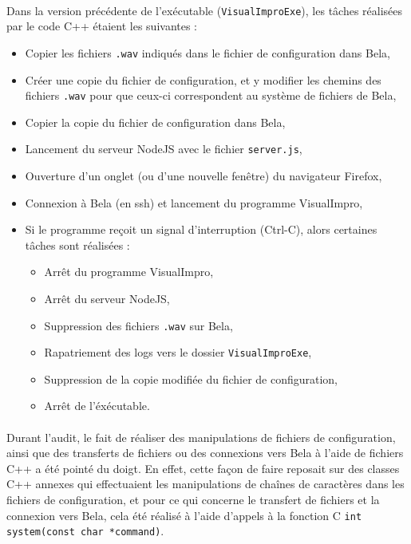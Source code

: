 \paragraph{}
Dans la version précédente de l'exécutable (\verb!VisualImproExe!),
les tâches réalisées par le code C++ étaient les suivantes :
\begin{itemize}
 \item Copier les fichiers \verb!.wav! indiqués dans le fichier de
       configuration dans Bela,
 \item Créer une copie du fichier de configuration, et y modifier les
       chemins des fichiers \verb!.wav! pour que ceux-ci correspondent au
       système de fichiers de Bela,
 \item Copier la copie du fichier de configuration dans Bela,
 \item Lancement du serveur NodeJS avec le fichier \verb!server.js!,
 \item Ouverture d'un onglet (ou d'une nouvelle fenêtre) du
       navigateur Firefox,
 \item Connexion à Bela (en ssh) et lancement du programme
       VisualImpro,
 \item Si le programme reçoit un signal d'interruption (Ctrl-C),
       alors certaines tâches sont réalisées :
       \begin{itemize}
        \item Arrêt du programme VisualImpro,
        \item Arrêt du serveur NodeJS,
        \item Suppression des fichiers \verb!.wav! sur Bela,
        \item Rapatriement des logs vers le dossier \verb!VisualImproExe!,
        \item Suppression de la copie modifiée du fichier de configuration,
        \item Arrêt de l'éxécutable.
       \end{itemize}
\end{itemize}
\paragraph{}
Durant l'audit, le fait de réaliser des manipulations de fichiers de
configuration, ainsi que des transferts de fichiers ou des connexions
vers Bela à l'aide de fichiers C++ a été pointé du doigt. En effet,
cette façon de faire reposait sur des classes C++ annexes qui
effectuaient les manipulations de chaînes de caractères dans les
fichiers de configuration, et pour ce qui concerne le transfert de
fichiers et la connexion vers Bela, cela été réalisé à l'aide d'appels
à la fonction C \verb!int system(const char *command)!.
